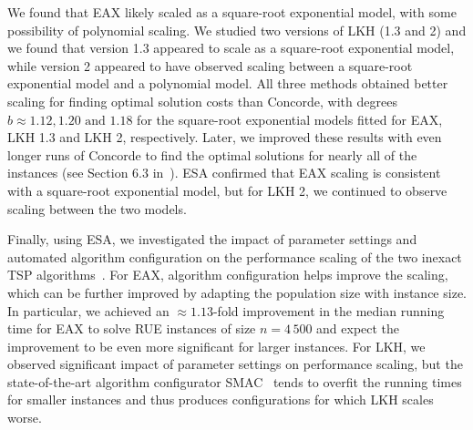 \documentclass[aic]{iosart2x}
\begin{document}
We found that EAX likely scaled as a square-root exponential model, with some possibility of polynomial scaling. We studied two versions of LKH (1.3 and 2) and we found that version 1.3 appeared to scale as a square-root exponential model, while version 2 appeared to have observed scaling between a square-root exponential model and a polynomial model. All three methods obtained better scaling for finding optimal solution costs than Concorde, with degrees $b \approx 1.12, 1.20 \text{ and } 1.18$ for the square-root exponential models fitted for EAX, LKH 1.3 and LKH 2, respectively. Later, we improved these results with even longer runs of Concorde to find the optimal solutions for nearly all of the instances (see Section 6.3 in~\cite{Mu15}). ESA confirmed that EAX scaling is consistent with a square-root exponential model, but for LKH 2, we continued to observe scaling between the two models. 

Finally, using ESA, we investigated the impact of parameter settings and automated algorithm configuration on the performance scaling of the two inexact TSP algorithms~\cite{MuEtAl16}. For EAX, algorithm configuration helps improve the scaling, which can be further improved by adapting the population size with instance size. In particular, we achieved an $\approx1.13$-fold improvement in the median running time for EAX to solve RUE instances of size $n=4\,500$ and expect the improvement to be even more significant for larger instances. For LKH, we observed significant impact of parameter settings on performance scaling, but the state-of-the-art algorithm configurator SMAC~\cite{hutter2011sequential} tends to overfit the running times for smaller instances and thus produces configurations for which LKH scales worse.
\end{document}
